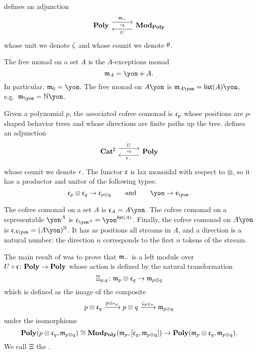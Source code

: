 \cite[Theorem 2.10]{libkind2024pattern} defines an adjunction
\[
    \adj{\poly}{\free_-}{U}{\modpoly}
\]
whose unit we denote $\zeta$ and whose counit we denote $\theta$.

\begin{example}
The free monad on a set $A$ is the $A$-exceptions monad
\[\free_A=\yon+A.\]
In particular, $\free_0=\yon$. The free monad on $A\yon$ is $\free_{A\yon}=\List(A)\yon$, e.g.\ $\free_\yon=\nn\yon$.
\end{example}

Given a polynomial $p$, the associated cofree comonad is $\mathfrak{c}_p$ whose positions are $p$-shaped behavior trees and whose directions are finite paths up the tree. 
\cite[Theorem 3.2]{libkind2024pattern} defines an adjunction 
\begin{equation}\label{eqn.cofree_adjunction}
    \adj{\catsharp}{U}{\cofree_-}{\poly}
\end{equation}
whose counit we denote $\epsilon$. The functor $\mathfrak{c}$ is lax monoidal with respect to $\otimes$, so it has a productor and unitor of the following types:
\begin{equation}\label{eqn.cofree_lax_monoidal}
\cofree_p\otimes\cofree_q\to\cofree_{p\otimes q}\qqand\yon\to\cofree_\yon.
\end{equation}

\begin{example}
The cofree comonad on a set $A$ is $\cofree_A=A\yon$. The cofree comonad on a representable $\yon^A$ is $\cofree_{\yon^A}=\yon^{\List(A)}$. Finally, the cofree comonad on $A\yon$ is $\cofree_{A\yon}=(A\yon)^\nn$. It has as positions all streams in $A$, and a direction is a natural number: the direction $n$ corresponds to the first $n$ tokens of the stream.

\end{example}

The main result of \cite[Theorem 3.4]{libkind2024pattern} was to prove that $\mathfrak{m}_-$ is a left module over $U \circ  \mathfrak{c} \colon \mathbf{Poly} \to \mathbf{Poly}$ whose action is defined by the natural transformation 
\[
    \Xi_{p,q}\colon \mathfrak{m}_p \otimes \mathfrak{c}_q \to \mathfrak{m}_{p \otimes q}
\] which is defined as the image of the composite
\[
    p \otimes \mathfrak{c}_q \xrightarrow{p \otimes \epsilon_q} p \otimes q \xrightarrow{\zeta_{p \otimes q}} \mathfrak{m}_{p \otimes q}
\] under the isomorphisms
\[
    \mathbf{Poly}(p \otimes \mathfrak{c}_q, \mathfrak{m}_{p\otimes q})  \cong \mathbf{Mod}_{\mathbf{Poly}}(\mathfrak{m}_p, [\mathfrak{c}_q, \mathfrak{m}_{p\otimes q}]) \to \mathbf{Poly}(\mathfrak{m}_p \otimes \mathfrak{c}_q, \mathfrak{m}_{p \otimes q}).
\] We call $\Xi$ the .



